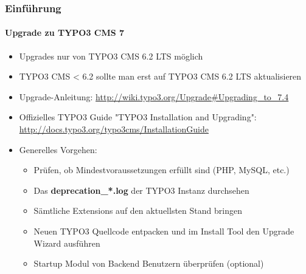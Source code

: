 \begin{frame}[fragile]
	\frametitle{Einführung}
	\framesubtitle{Upgrade zu TYPO3 CMS 7}

	\begin{itemize}
		\item Upgrades nur von TYPO3 CMS 6.2 LTS möglich
		\item TYPO3 CMS < 6.2 sollte man erst auf TYPO3 CMS 6.2 LTS aktualisieren
	\end{itemize}

	\begin{itemize}

		\item Upgrade-Anleitung:\newline
			\smaller\url{http://wiki.typo3.org/Upgrade#Upgrading_to_7.4}\normalsize
		\item Offizielles TYPO3 Guide "TYPO3 Installation and Upgrading":
			\smaller\url{http://docs.typo3.org/typo3cms/InstallationGuide}\normalsize
		\item Generelles Vorgehen:
			\begin{itemize}
				\item Prüfen, ob Mindestvoraussetzungen erfüllt sind \small(PHP, MySQL, etc.)
				\item Das \textbf{deprecation\_*.log} der TYPO3 Instanz durchsehen
				\item Sämtliche Extensions auf den aktuellsten Stand bringen
				\item Neuen TYPO3 Quellcode entpacken und im Install Tool den Upgrade Wizard ausführen
				\item Startup Modul von Backend Benutzern überprüfen (optional)
			\end{itemize}
	\end{itemize}

\end{frame}

